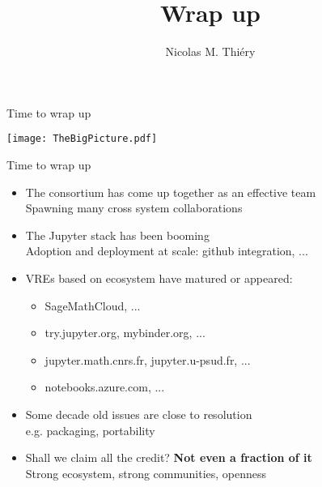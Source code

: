 \documentclass{beamer}
\author{Nicolas M. Thiéry}
\title{Wrap up}
\begin{document}
\begin{frame}{Time to wrap up}

  \texttt{[image: TheBigPicture.pdf]}
\end{frame}

\begin{frame}{Time to wrap up}
  \begin{itemize}
  \item The consortium has come up together as an effective team\\
    Spawning many cross system collaborations
    \pause\bigskip
  \item The Jupyter stack has been booming\\
    Adoption and deployment at scale: github integration, ...
    \pause\bigskip
  \item VREs based on ecosystem have matured or appeared:
    \begin{itemize}
    \item SageMathCloud, ...
    \item try.jupyter.org, mybinder.org, ...
    \item jupyter.math.cnrs.fr, jupyter.u-psud.fr, ...
    \item notebooks.azure.com, ...
    \end{itemize}
    \pause\bigskip
  \item Some decade old issues are close to resolution\\
    e.g. packaging, portability
    \pause\bigskip
  \item Shall we claim all the credit? \pause \textbf{Not even a fraction of it}\\
    Strong ecosystem, strong communities, openness
  \end{itemize}
\end{frame}
\end{document}
